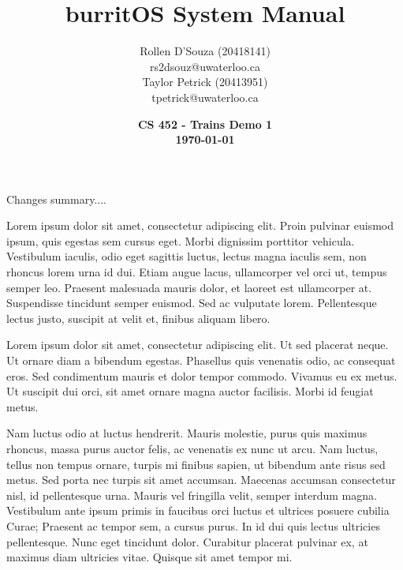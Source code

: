 \documentclass[twoside,a4paper]{refart}
\title{burritOS System Manual}
\author{Rollen D'Souza (20418141) \\
rs2dsouz@uwaterloo.ca \\
Taylor Petrick (20413951) \\
tpetrick@uwaterloo.ca \\}
\date{\textbf{CS 452 - Trains Demo 1 \\ \today}}
\begin{document}
\maketitle

Changes summary....

Lorem ipsum dolor sit amet, consectetur adipiscing elit. Proin pulvinar euismod ipsum, quis egestas sem cursus eget. Morbi dignissim porttitor vehicula. Vestibulum iaculis, odio eget sagittis luctus, lectus magna iaculis sem, non rhoncus lorem urna id dui. Etiam augue lacus, ullamcorper vel orci ut, tempus semper leo. Praesent malesuada mauris dolor, et laoreet est ullamcorper at. Suspendisse tincidunt semper euismod. Sed ac vulputate lorem. Pellentesque lectus justo, suscipit at velit et, finibus aliquam libero.

Lorem ipsum dolor sit amet, consectetur adipiscing elit. Ut sed placerat neque. Ut ornare diam a bibendum egestas. Phasellus quis venenatis odio, ac consequat eros. Sed condimentum mauris et dolor tempor commodo. Vivamus eu ex metus. Ut suscipit dui orci, sit amet ornare magna auctor facilisis. Morbi id feugiat metus.

Nam luctus odio at luctus hendrerit. Mauris molestie, purus quis maximus rhoncus, massa purus auctor felis, ac venenatis ex nunc ut arcu. Nam luctus, tellus non tempus ornare, turpis mi finibus sapien, ut bibendum ante risus sed metus. Sed porta nec turpis sit amet accumsan. Maecenas accumsan consectetur nisl, id pellentesque urna. Mauris vel fringilla velit, semper interdum magna. Vestibulum ante ipsum primis in faucibus orci luctus et ultrices posuere cubilia Curae; Praesent ac tempor sem, a cursus purus. In id dui quis lectus ultricies pellentesque. Nunc eget tincidunt dolor. Curabitur placerat pulvinar ex, at maximus diam ultricies vitae. Quisque sit amet tempor mi.

\newpage
\tableofcontents
\newpage

\end{document}

